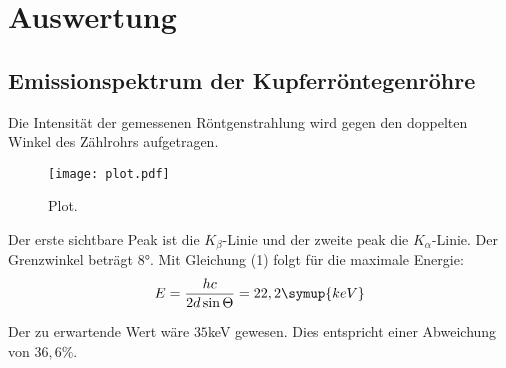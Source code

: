 \section{Auswertung}
\label{sec:Auswertung}

\subsection{Emissionspektrum der Kupferröntegenröhre}

Die Intensität der gemessenen Röntgenstrahlung wird gegen den doppelten Winkel des Zählrohrs aufgetragen.

\begin{figure}
  \centering
  \texttt{[image: plot.pdf]}
  \caption{Plot.}
  \label{fig:plot}
\end{figure}

Der erste sichtbare Peak ist die $K_{\beta}$-Linie und der zweite peak die $K_{\alpha}$-Linie.
Der Grenzwinkel beträgt $8$°.
Mit Gleichung (1) folgt für die maximale Energie:
\begin{equation}
  E = \frac{hc}{2d \sin{\Theta}} = 22,2 \symup{keV}
\end{equation}

Der zu erwartende Wert wäre $35$keV gewesen.
Dies entspricht einer Abweichung von $36,6 \%$.
